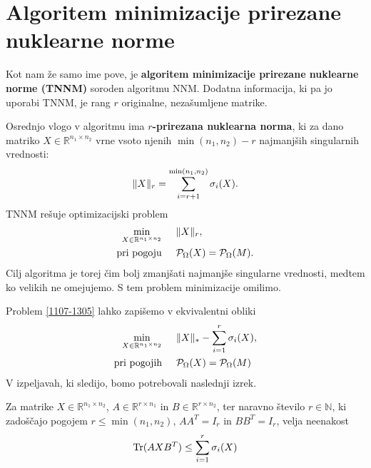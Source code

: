 \section{Algoritem minimizacije prirezane nuklearne norme}
Kot nam že samo ime pove, je \textbf{algoritem minimizacije prirezane nuklearne norme (TNNM)} \cite{TNNM-HZYLH12} soroden algoritmu NNM. Dodatna informacija, ki pa jo uporabi TNNM, je rang $r$ originalne, nezašumljene matrike.

Osrednjo vlogo v algoritmu ima \textbf{$r$-prirezana nuklearna norma}, ki za dano matriko $X \in \mathbb{R}^{n_1 \times n_2}$ vrne vsoto njenih $\min(n_1,n_2) - r$ najmanjših singularnih vrednosti:
\[
    \lVert X\rVert_r = \sum^{\min(n_1, n_2)}_{i = r + 1} \sigma_i(X).
\]
TNNM rešuje optimizacijski problem
\begin{align}
    \label{1107-1305}
    \begin{split}
        \min_{X\in  \mathbb{R}^{n_1 \times n_2}}              & \hspace{0.5cm} \lVert X\rVert_r, \\
        \textrm{pri pogoju} & \hspace{0.5cm} \mathcal{P}_\Omega(X) = \mathcal{P}_\Omega(M).
    \end{split}
\end{align}
Cilj algoritma je torej čim bolj zmanjšati najmanjše singularne vrednosti, medtem ko velikih ne omejujemo. S tem problem minimizacije omilimo.

Problem \eqref{1107-1305} lahko zapišemo v ekvivalentni obliki 
\begin{align}
    \label{2507-0835}
    \begin{split}
        \min_{X\in  \mathbb{R}^{n_1 \times n_2}}              & \hspace{0.5cm} \lVert X\rVert_* - \sum_{i=1}^{r} \sigma_i(X), \\
        \textrm{pri pogojih} & \hspace{0.5cm} \mathcal{P}_\Omega(X) = \mathcal{P}_\Omega(M)
    \end{split}
\end{align}
V izpeljavah, ki sledijo, bomo potrebovali naslednji izrek.

\begin{theorem}
    \label{2507-0850}
    Za matrike $X \in \mathbb{R}^{n_1 \times n_2}$, $A \in \mathbb{R}^{r \times n_1}$ in $B \in \mathbb{R}^{r \times n_2}$,
    ter naravno število $r \in \mathbb{N}$, ki zadoščajo pogojem $r \leq \min(n_1, n_2)$, $AA^T = I_{r}$  in $BB^T = I_{r}$, velja neenakost
    \begin{align}
        \label{2507-0836}
        \operatorname{Tr}(AXB^T) \leq \sum_{i=1}^{r} \sigma_i(X)
    \end{align}
\end{theorem}

